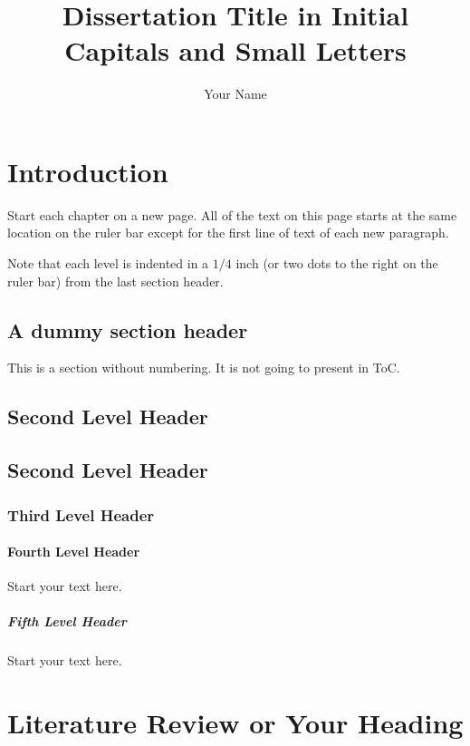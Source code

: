 \documentclass[debug, font=Times]{gw-dissertation}[2021/11/19]
\title{Dissertation Title in Initial Capitals and Small Letters}
\author{Your Name}
\begin{document}
\chapter{Introduction}

Start each chapter on a new page. All of the text on this page starts at the same location on the
ruler bar except for the first line of text of each new paragraph.

Note that each level is indented in a $1/4$ inch (or two dots to the right on the ruler bar) from
the last section header. 
    
    \section*{A dummy section header}
    This is a section without numbering. It is not going to present in ToC.

    \section{Second Level Header}
    \lipsum[6]

    \section{Second Level Header}
    \lipsum[4]

        \subsection{Third Level Header}
        \lipsum[5-6]

            \subsubsection{Fourth Level Header}
            Start your text here.

                \paragraph{Fifth Level Header}
                Start your text here.

\chapter{Literature Review or Your Heading}
\end{document}
